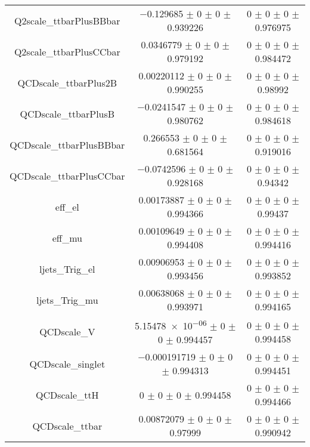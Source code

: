 \begin{table}
\begin{tabular}{ccc}
Q2scale\_ttbarPlusBBbar & \num{-0.129685} $\pm$ \num{0} $\pm$ \num{0} $\pm$ \num{0.939226} & \num{0} $\pm$ \num{0} $\pm$ \num{0} $\pm$ \num{0.976975}\\
Q2scale\_ttbarPlusCCbar & \num{0.0346779} $\pm$ \num{0} $\pm$ \num{0} $\pm$ \num{0.979192} & \num{0} $\pm$ \num{0} $\pm$ \num{0} $\pm$ \num{0.984472}\\
QCDscale\_ttbarPlus2B & \num{0.00220112} $\pm$ \num{0} $\pm$ \num{0} $\pm$ \num{0.990255} & \num{0} $\pm$ \num{0} $\pm$ \num{0} $\pm$ \num{0.98992}\\
QCDscale\_ttbarPlusB & \num{-0.0241547} $\pm$ \num{0} $\pm$ \num{0} $\pm$ \num{0.980762} & \num{0} $\pm$ \num{0} $\pm$ \num{0} $\pm$ \num{0.984618}\\
QCDscale\_ttbarPlusBBbar & \num{0.266553} $\pm$ \num{0} $\pm$ \num{0} $\pm$ \num{0.681564} & \num{0} $\pm$ \num{0} $\pm$ \num{0} $\pm$ \num{0.919016}\\
QCDscale\_ttbarPlusCCbar & \num{-0.0742596} $\pm$ \num{0} $\pm$ \num{0} $\pm$ \num{0.928168} & \num{0} $\pm$ \num{0} $\pm$ \num{0} $\pm$ \num{0.94342}\\
eff\_el & \num{0.00173887} $\pm$ \num{0} $\pm$ \num{0} $\pm$ \num{0.994366} & \num{0} $\pm$ \num{0} $\pm$ \num{0} $\pm$ \num{0.99437}\\
eff\_mu & \num{0.00109649} $\pm$ \num{0} $\pm$ \num{0} $\pm$ \num{0.994408} & \num{0} $\pm$ \num{0} $\pm$ \num{0} $\pm$ \num{0.994416}\\
ljets\_Trig\_el & \num{0.00906953} $\pm$ \num{0} $\pm$ \num{0} $\pm$ \num{0.993456} & \num{0} $\pm$ \num{0} $\pm$ \num{0} $\pm$ \num{0.993852}\\
ljets\_Trig\_mu & \num{0.00638068} $\pm$ \num{0} $\pm$ \num{0} $\pm$ \num{0.993971} & \num{0} $\pm$ \num{0} $\pm$ \num{0} $\pm$ \num{0.994165}\\
QCDscale\_V & \num{5.15478e-06} $\pm$ \num{0} $\pm$ \num{0} $\pm$ \num{0.994457} & \num{0} $\pm$ \num{0} $\pm$ \num{0} $\pm$ \num{0.994458}\\
QCDscale\_singlet & \num{-0.000191719} $\pm$ \num{0} $\pm$ \num{0} $\pm$ \num{0.994313} & \num{0} $\pm$ \num{0} $\pm$ \num{0} $\pm$ \num{0.994451}\\
QCDscale\_ttH & \num{0} $\pm$ \num{0} $\pm$ \num{0} $\pm$ \num{0.994458} & \num{0} $\pm$ \num{0} $\pm$ \num{0} $\pm$ \num{0.994466}\\
QCDscale\_ttbar & \num{0.00872079} $\pm$ \num{0} $\pm$ \num{0} $\pm$ \num{0.97999} & \num{0} $\pm$ \num{0} $\pm$ \num{0} $\pm$ \num{0.990942}\\

\end{tabular}
\end{table}
